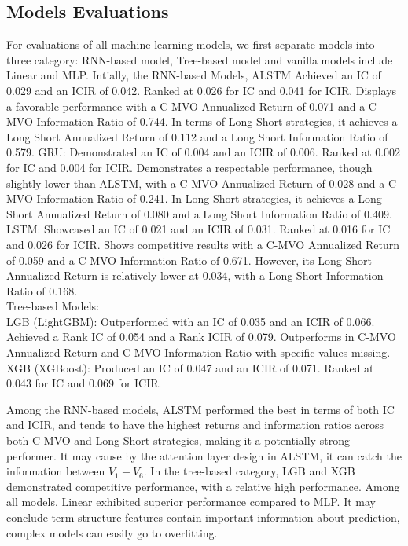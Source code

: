 \documentclass[10pt,letterpaper]{article}
\begin{document}
\subsection*{Models Evaluations}
For evaluations of all machine learning models, we first separate models into three category: RNN-based model, Tree-based model and vanilla models include Linear and MLP.
Intially, the RNN-based Models, ALSTM Achieved an IC of 0.029 and an ICIR of 0.042. Ranked at 0.026 for IC and 0.041 for ICIR. Displays a favorable performance with a C-MVO Annualized Return of 0.071 and a C-MVO Information Ratio of 0.744. In terms of Long-Short strategies, it achieves a Long Short Annualized Return of 0.112 and a Long Short Information Ratio of 0.579.
GRU: Demonstrated an IC of 0.004 and an ICIR of 0.006. Ranked at 0.002 for IC and 0.004 for ICIR. Demonstrates a respectable performance, though slightly lower than ALSTM, with a C-MVO Annualized Return of 0.028 and a C-MVO Information Ratio of 0.241. In Long-Short strategies, it achieves a Long Short Annualized Return of 0.080 and a Long Short Information Ratio of 0.409.
LSTM: Showcased an IC of 0.021 and an ICIR of 0.031. Ranked at 0.016 for IC and 0.026 for ICIR. Shows competitive results with a C-MVO Annualized Return of 0.059 and a C-MVO Information Ratio of 0.671. However, its Long Short Annualized Return is relatively lower at 0.034, with a Long Short Information Ratio of 0.168.
\\Tree-based Models:
\\LGB (LightGBM): Outperformed with an IC of 0.035 and an ICIR of 0.066. Achieved a Rank IC of 0.054 and a Rank ICIR of 0.079. Outperforms in C-MVO Annualized Return and C-MVO Information Ratio with specific values missing.
XGB (XGBoost): Produced an IC of 0.047 and an ICIR of 0.071. Ranked at 0.043 for IC and 0.069 for ICIR.

Among the RNN-based models, ALSTM performed the best in terms of both IC and ICIR, and tends to have the highest returns and information ratios across both C-MVO and Long-Short strategies, making it a potentially strong performer. It may cause by the attention layer design in ALSTM, it can catch the information between $V_1-V_6$.
In the tree-based category, LGB and XGB demonstrated competitive performance, with a relative high performance.
Among all models, Linear exhibited superior performance compared to MLP. It may conclude term structure features contain important information about prediction, complex models can easily go to overfitting.
\end{document}
